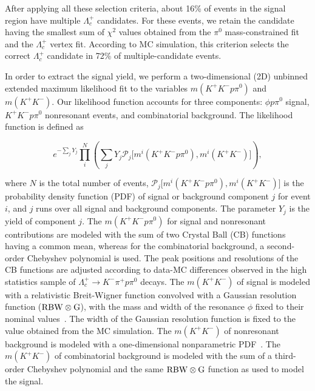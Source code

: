 \documentclass[aps,prl,twocolumn,superscriptaddress,showpacs,preprintnumbers,amsmath,amssymb]{revtex4-1}
\begin{document}
After applying all these selection criteria, about 16\% of events  in the signal region have multiple $\Lambda_c^+$ candidates.
For these events, we retain the candidate having the smallest sum of $\chi^2$ values obtained from the $\pi^0$ mass-constrained fit and the $\Lambda_c^+$ vertex fit. According to MC simulation, this criterion selects the correct $\Lambda_c^+$ candidate in 72\% of multiple-candidate events. 

In order to extract the signal yield, we perform a two-dimensional (2D) unbinned extended maximum likelihood fit to the variables $m (K^+K^-p\pi^0)$ and  $m(K^+K^-)$.  Our likelihood function  accounts for three components: $\phi p\pi^0$ signal, $K^+K^-p\pi^0$ nonresonant events, and  combinatorial background. The likelihood  function is defined as
\begin{linenomath}
\begin{equation}
e^{-\sum_j Y_j}\prod_i^N\left( \sum_j Y_j\mathcal{P}_j\big[m^i(K^+K^- p\pi^0),m^i(K^+K^-)\big]\right),
\end{equation}
\end{linenomath}
where $N$ is the total number of events, $\mathcal{P}_j\big[m^i(K^+K^- p\pi^0),m^i(K^+K^-)\big]$  is the probability density function (PDF) of signal or background component $j$ for event $i$, and $j$ runs over all signal and background components. The parameter $Y_j$ is the yield of component $j$. %
The $m(K^+K^-p\pi^0)$ for signal and nonresonant contributions are modeled with the sum of two Crystal Ball (CB) functions~\cite{Skwarnicki:1986xj} having a common mean, whereas for the combinatorial background, a second-order Chebyshev polynomial  is used. The peak positions and resolutions of the CB functions are
adjusted according to data-MC differences observed in the high statistics  sample of $\Lambda_c^+\to K^-\pi^+p\pi^0$ decays. The $m(K^+K^-)$ of signal is modeled with a relativistic Breit-Wigner  function convolved with a Gaussian resolution function ($\rm RBW\otimes G$), with the mass and width of the resonance $\phi$  fixed to their nominal values~\cite{PDG}. The width of the Gaussian resolution function is fixed to the value obtained from the MC simulation. The $m(K^+K^-)$ of nonresonant  background is modeled with a one-dimensional nonparametric PDF~\cite{Cranmer:2000du}.  The $m(K^+K^-)$ of combinatorial background  is modeled with the sum of  a third-order Chebyshev polynomial and the same ${\rm RBW\otimes G}$ function as used to model the signal.
\end{document}
